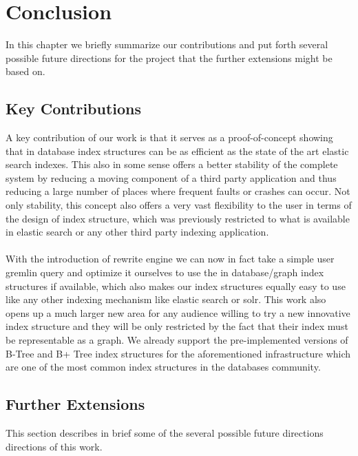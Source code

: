 

\chapter{Conclusion} %

\label{Chapter 7} %

In this chapter we briefly summarize our contributions and put forth several possible future directions for the project that the further extensions might be based on.

\section{Key Contributions}
A key contribution of our work is that it serves as a proof-of-concept showing that in database index structures can be as efficient as the state of the art elastic search indexes. This also in some sense offers a better stability of the complete system by reducing a moving component of a third party application and thus reducing a large number of places where frequent faults or crashes can occur. Not only stability, this concept also offers a very vast flexibility to the user in terms of the design of index structure, which was previously restricted to what is available in elastic search or any other third party indexing application.\\
\\
With the introduction of rewrite engine we can now in fact take a simple user gremlin query and optimize it ourselves to use the in database/graph index structures if available, which also makes our index structures equally easy to use like any other indexing mechanism like elastic search or solr. This work also opens up a much larger new area for any audience willing to try a new innovative index structure and they will be only restricted by the fact that their index must be representable as a graph. We already support the pre-implemented versions of B-Tree and B+ Tree index structures for the aforementioned infrastructure which are one of the most common index structures in the databases community.

\section{Further Extensions}
This section describes in brief some of the several possible future directions directions of this work.

